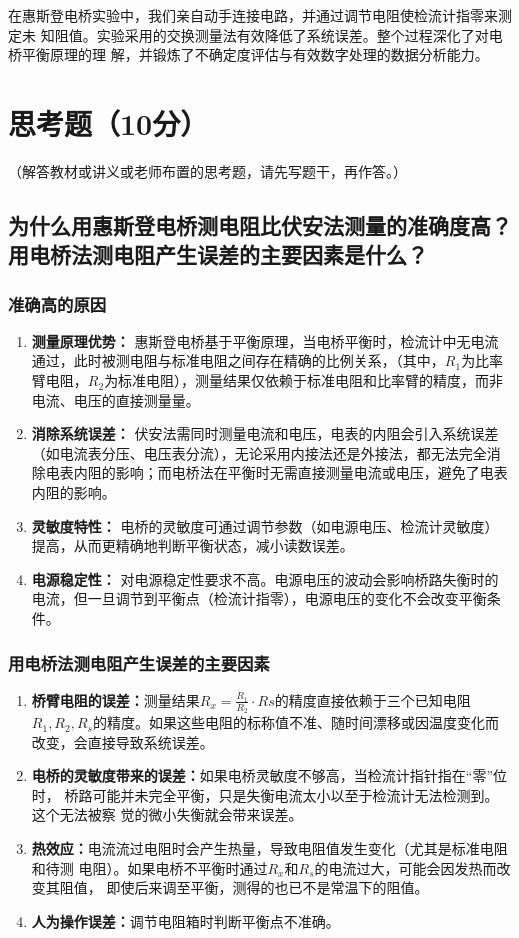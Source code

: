 \documentclass{../template/Report}%
\begin{document}
\begin{fullreportonly}
在惠斯登电桥实验中，我们亲自动手连接电路，并通过调节电阻使检流计指零来测定未
知阻值。实验采用的交换测量法有效降低了系统误差。整个过程深化了对电桥平衡原理的理
解，并锻炼了不确定度评估与有效数字处理的数据分析能力。
\section{思考题（10分）}
（解答教材或讲义或老师布置的思考题，请先写题干，再作答。）
\subsection{为什么用惠斯登电桥测电阻比伏安法测量的准确度高？用电桥法测电阻产生误差的主要因素是什么？}

\subsubsection{准确高的原因}
\begin{enumerate}
    \item \textbf{测量原理优势：} 惠斯登电桥基于平衡原理，当电桥平衡时，检流计中无电流通过，此时被测电阻与标准电阻之间存在精确的比例关系，（其中，$R_1$为比率臂电阻，$R_2$为标准电阻），测量结果仅依赖于标准电阻和比率臂的精度，而非电流、电压的直接测量量。

    \item \textbf{消除系统误差：} 伏安法需同时测量电流和电压，电表的内阻会引入系统误差（如电流表分压、电压表分流），无论采用内接法还是外接法，都无法完全消除电表内阻的影响；而电桥法在平衡时无需直接测量电流或电压，避免了电表内阻的影响。

    \item \textbf{灵敏度特性：} 电桥的灵敏度可通过调节参数（如电源电压、检流计灵敏度）提高，从而更精确地判断平衡状态，减小读数误差。

    \item \textbf{电源稳定性：} 对电源稳定性要求不高。电源电压的波动会影响桥路失衡时的电流，但一旦调节到平衡点（检流计指零），电源电压的变化不会改变平衡条件。
\end{enumerate}
\subsubsection{用电桥法测电阻产生误差的主要因素}
\begin{enumerate}
    \item \textbf{桥臂电阻的误差：}测量结果$ R_x = \frac{R_1}{R_2} \cdot Rs $的精度直接依赖于三个已知电阻$R_1, R_2, R_s$的精度。如果这些电阻的标称值不准、随时间漂移或因温度变化而改变，会直接导致系统误差。
    \item \textbf{电桥的灵敏度带来的误差：}如果电桥灵敏度不够高，当检流计指针指在“零”位时，
        桥路可能并未完全平衡，只是失衡电流太小以至于检流计无法检测到。这个无法被察
        觉的微小失衡就会带来误差。
    \item \textbf{热效应：}电流流过电阻时会产生热量，导致电阻值发生变化（尤其是标准电阻和待测
        电阻）。如果电桥不平衡时通过$R_x$和$R_s$的电流过大，可能会因发热而改变其阻值，
        即使后来调至平衡，测得的也已不是常温下的阻值。
    \item \textbf{人为操作误差：}调节电阻箱时判断平衡点不准确。
\end{enumerate}

\end{fullreportonly}
\end{document}
